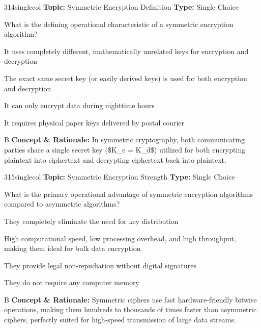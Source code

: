 \begin{qcard}{314}{singlecol}
\textcolor{darkslate!75}{\small\textbf{Topic:} Symmetric Encryption Definition \hfill \textbf{Type:} Single Choice}\vspace{0.4em}\par
What is the defining operational characteristic of a symmetric encryption algorithm?
\begin{qoptions}
\item It uses completely different, mathematically unrelated keys for encryption and decryption
\item The exact same secret key (or easily derived keys) is used for both encryption and decryption
\item It can only encrypt data during nighttime hours
\item It requires physical paper keys delivered by postal courier
\end{qoptions}
\end{qcard}
\nopagebreak
\begin{explainbox}{B}
\textbf{Concept \& Rationale:} In symmetric cryptography, both communicating parties share a single secret key (\$K\_e = K\_d\$) utilized for both encrypting plaintext into ciphertext and decrypting ciphertext back into plaintext.
\end{explainbox}

\begin{qcard}{315}{singlecol}
\textcolor{darkslate!75}{\small\textbf{Topic:} Symmetric Encryption Strength \hfill \textbf{Type:} Single Choice}\vspace{0.4em}\par
What is the primary operational advantage of symmetric encryption algorithms compared to asymmetric algorithms?
\begin{qoptions}
\item They completely eliminate the need for key distribution
\item High computational speed, low processing overhead, and high throughput, making them ideal for bulk data encryption
\item They provide legal non-repudiation without digital signatures
\item They do not require any computer memory
\end{qoptions}
\end{qcard}
\nopagebreak
\begin{explainbox}{B}
\textbf{Concept \& Rationale:} Symmetric ciphers use fast hardware-friendly bitwise operations, making them hundreds to thousands of times faster than asymmetric ciphers, perfectly suited for high-speed transmission of large data streams.
\end{explainbox}

